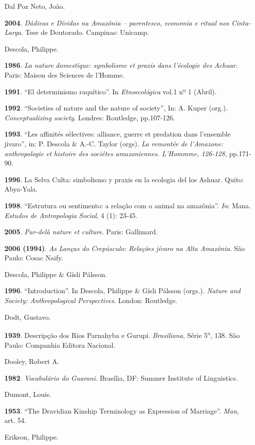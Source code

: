 Dal Poz Neto, João.

\textbf{2004}. \emph{Dádivas e Dívidas na Amazônia -- parentesco,
economia e ritual nos Cinta-Larga}. Tese de Doutorado. Campinas:
Unicamp.

Descola, Philippe.

\textbf{1986}. \emph{La nature domestique: symbolisme et praxis dans
l'écologie des Achuar}. Paris: Maison des Sciences de l'Homme.

\textbf{1991}. ``El determinismo raquítico''. In \emph{Etnoecológica}
vol.1 nº 1 (Abril).

\textbf{1992}. ``Societies of nature and the nature of society'', In: A.
Kuper (org.). \emph{Conceptualizing society}. Londres: Routledge,
pp.107-126.

\textbf{1993}. ``Les affinités sélectives: alliance, guerre et predation
dans l'ensemble jivaro'', in: P. Descola \& A.-C. Taylor (orgs). \emph{La
remontée de l'Amazone: anthropologie et histoire des sociétes
amazoniennes. L'Hommme, 126-128}, pp.171-90.

\textbf{1996}. La Selva Culta: simbolismo y praxis en la ecologia del
los Ashuar. Quito: Abya-Yala.

\textbf{1998}. ``Estrutura ou sentimento: a relação com o animal na
amazônia''. \emph{In}: Mana. \emph{Estudos de Antropologia Social}, 4 (1):
23-45.

\textbf{2005}. \emph{Par-delà nature et culture}. Paris: Gallimard.

\textbf{2006 (1994)}. \emph{As Lanças do Crepúsculo: Relações jívaro na
Alta Amazônia}. São Paulo: Cosac Naify.

Descola, Philippe \& Gísli Pálsson.

\textbf{1996}. ``Introduction''. In Descola, Philippe \& Gísli Pálsson
(orgs.). \emph{Nature and Society: Anthropological Perspectives}.
London: Routledge.

Dodt, Gustavo.

\textbf{1939}. Descripção dos Rios Parnahyba e Gurupi.
\emph{Brasiliana}, Série 5\textsuperscript{{a}}, 138. São Paulo:
Companhia Editora Nacional.

Dooley, Robert A.

\textbf{1982}. \emph{Vocabulário do Guarani}. Brasília, DF: Summer
Institute of Linguistics.

Dumont, Louis.

\textbf{1953}. ``The Dravidian Kinship Terminology as Expression of
Marriage''. \emph{Man}, art. 54.

Erikson, Philippe.


